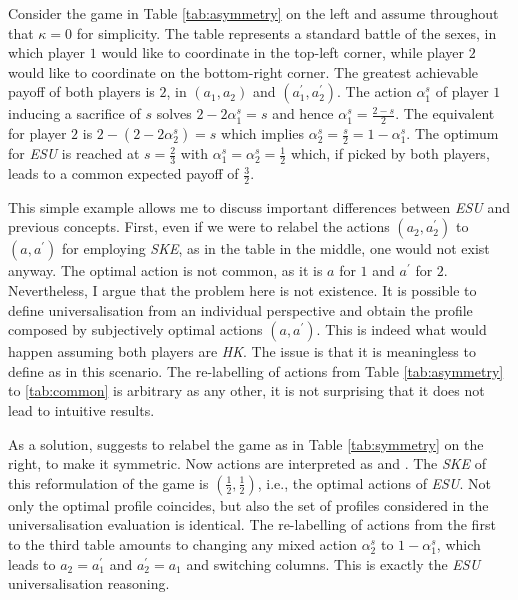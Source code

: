 \vspace*{0.4cm}

Consider the game in Table \ref{tab:asymmetry} on the left and assume throughout that \( \kappa = 0 \) for simplicity. The table represents a standard battle of the sexes, in which player \( 1 \) would like to coordinate in the top-left corner, while player \( 2 \) would like to coordinate on the bottom-right corner. The greatest achievable payoff of both players is \(2\), in \((a_1, a_2)\) and \((a_1^{\prime}, a_2^{\prime} )\). The action \(\alpha_1^{s}\) of player \(1\) inducing a sacrifice of \(s\) solves \(2 - 2 \alpha_1^{s} = s\) and hence \(\alpha_1^{s} = \frac{2 - s}{2}\). The equivalent for player \(2\) is \(2 - (2 -  2 \alpha_2^{s}) = s\) which implies \(\alpha_2^{s} = \frac{s}{2} = 1 - \alpha_1^{s}\). The optimum for \textit{ESU} is reached at \(s= \frac{2}{3}\) with \(\alpha_1^{s} = \alpha_2^{s} = \frac{1}{2}\) which, if picked by both players, leads to a common expected payoff of \(\frac{3}{2}\).

This simple example allows me to discuss important differences between \textit{ESU} and previous concepts. First, even if we were to relabel the actions \(( a_2, a_2^{\prime})\) to \((a, a^{\prime} )\) for employing \textit{SKE}, as in the table in the middle, one would not exist anyway. The optimal action is not common, as it is \(a\) for \(1\) and \(a^{\prime}\) for \(2\). Nevertheless, I argue that the problem here is not existence. It is possible to define universalisation from an individual perspective and obtain the profile composed by subjectively optimal actions \(( a, a^{\prime} )\). This is indeed what would happen assuming both players are \textit{HK}. The issue is that it is meaningless to define  as  in this scenario. The re-labelling of actions from Table \ref{tab:asymmetry} to \ref{tab:common} is arbitrary as any other, it is not surprising that it does not lead to intuitive results.

As a solution, \citet[p. 26]{roemer2019we} suggests to relabel the game as in Table \ref{tab:symmetry} on the right, to make it symmetric. Now actions are interpreted as  and . The \textit{SKE} of this reformulation of the game is \(( \frac{1}{2}, \frac{1}{2} )\), i.e., the optimal actions of \textit{ESU}. Not only the optimal profile coincides, but also the set of profiles considered in the universalisation evaluation is identical. The re-labelling of actions from the first to the third table amounts to changing any mixed action \(\alpha_2^{s}\) to \(1 - \alpha_1^{s}\), which leads to \(a_2=a_1^{\prime}\) and \(a_2^{\prime}=a_1\) and switching columns. This is exactly the \textit{ESU} universalisation reasoning.

